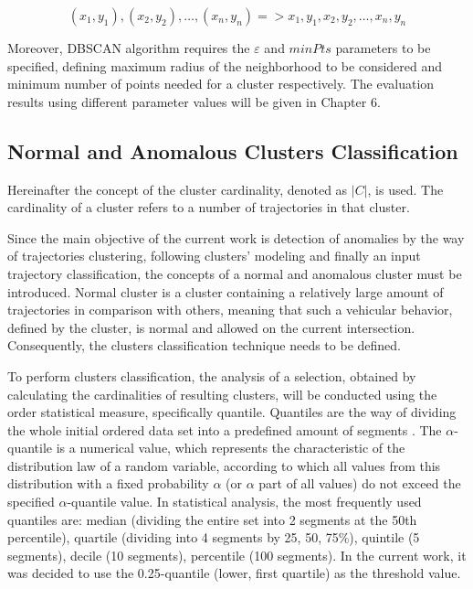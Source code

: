 \begin{equation} \label{eq:dbscan-flatten}
	{(x_1, y_1), (x_2, y_2), \ldots, (x_n, y_n)} = > {x_1, y_1, x_2, y_2, \ldots, x_n, y_n}
\end{equation}

Moreover, DBSCAN algorithm requires the $\varepsilon$ and $minPts$ parameters to be specified, defining maximum radius of the neighborhood to be considered and minimum number of points needed for a cluster respectively. The evaluation results using different parameter values will be given in Chapter 6.

\subsection{Normal and Anomalous Clusters Classification}

Hereinafter the concept of the cluster cardinality, denoted as $|C|$, is used.
The cardinality of a cluster refers to a number of trajectories in that cluster.

Since the main objective of the current work is detection of anomalies by the way of trajectories clustering, following clusters' modeling and finally an input trajectory classification, the concepts of a normal and anomalous cluster must be introduced. Normal cluster is a cluster containing a relatively large amount of trajectories in comparison with others, meaning that such a vehicular behavior, defined by the cluster, is normal and allowed on the current intersection. Consequently, the clusters classification technique needs to be defined.

To perform clusters classification, the analysis of a selection, obtained by calculating the cardinalities of resulting clusters, will be conducted using the order statistical measure, specifically quantile. Quantiles are the way of dividing the whole initial ordered data set into a predefined amount of segments \cite{inbook:stats}. The $\alpha$-quantile is a numerical value, which represents the characteristic of the distribution law of a random variable, according to which all values from this distribution with a fixed probability $\alpha$ (or $\alpha$ part of all values) do not exceed the specified $\alpha$-quantile value. In statistical analysis, the most frequently used quantiles are: median (dividing the entire set into 2 segments at the 50th percentile), quartile (dividing into 4 segments by 25, 50, 75\%), quintile (5 segments), decile (10 segments), percentile (100 segments). In the current work, it was decided to use the 0.25-quantile (lower, first quartile) as the threshold value.

